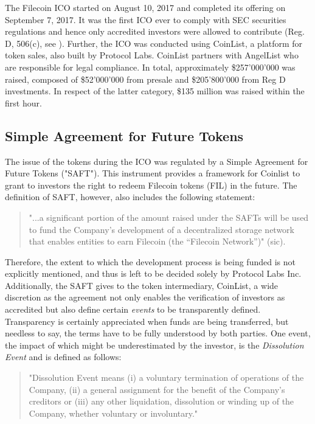 \documentclass[conference]{IEEEtran}
\begin{document}
The Filecoin ICO started on August 10, 2017 and completed its offering on September 7, 2017.
It was the first ICO ever to comply with SEC securities regulations and hence only accredited investors were allowed to contribute (Reg. D, 506(c), see \cite{regulation-506}).
Further, the ICO was conducted using CoinList\cite{coinlist}, a platform for token sales, also built by Protocol Labs.
CoinList partners with AngelList\cite{angellist} who are responsible for legal compliance.
In total, approximately \$257'000'000 was raised, composed of \$52'000'000 from presale and \$205'800'000 from Reg D investments.
In respect of the latter category, \$135 million was raised within the first hour.

\subsection{Simple Agreement for Future Tokens}
\label{subsec:saft}
The issue of the tokens during the ICO was regulated by a Simple Agreement for Future Tokens ("SAFT"). 
This instrument provides a framework for Coinlist to grant to investors the right to redeem Filecoin tokens (FIL) in the future.
The definition of SAFT, however, also includes the following statement:
\begin{quotation}
"...a significant portion of the amount raised under the SAFTs will be used to fund the Company’s development of a decentralized storage network that enables entities to earn Filecoin (the “Filecoin Network”)" (sic).\cite{saft-agreement}
\end{quotation}
Therefore, the extent to which the development process is being funded is not explicitly mentioned, and thus is left to be decided solely by Protocol Labs Inc.
Additionally, the SAFT gives to the token intermediary, CoinList, a wide discretion as the agreement not only enables the verification of investors as accredited but also define certain \textit{events} to be transparently defined.
Transparency is certainly appreciated when funds are being transferred, but needless to say, the terms have to be fully understood by both parties.
One event, the impact of which might be underestimated by the investor, is the \textit{Dissolution Event} and is defined as follows:
\begin{quotation}
"Dissolution Event means (i) a voluntary termination of operations of the Company, (ii)
a general assignment for the benefit of the Company’s creditors or (iii) any other liquidation,
dissolution or winding up of the Company, whether voluntary or involuntary."\cite{saft-agreement}
\end{quotation}
\end{document}
